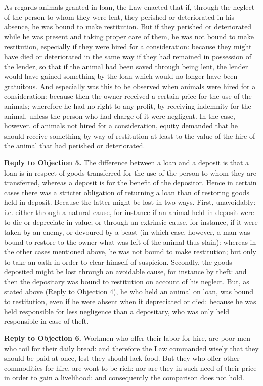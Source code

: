 As regards animals granted in loan, the Law enacted that if, through the neglect of the person to whom they were lent, they perished or deteriorated in his absence, he was bound to make restitution. But if they perished or deteriorated while he was present and taking proper care of them, he was not bound to make restitution, especially if they were hired for a consideration: because they might have died or deteriorated in the same way if they had remained in possession of the lender, so that if the animal had been saved through being lent, the lender would have gained something by the loan which would no longer have been gratuitous. And especially was this to be observed when animals were hired for a consideration: because then the owner received a certain price for the use of the animals; wherefore he had no right to any profit, by receiving indemnity for the animal, unless the person who had charge of it were negligent. In the case, however, of animals not hired for a consideration, equity demanded that he should receive something by way of restitution at least to the value of the hire of the animal that had perished or deteriorated.

\textbf{Reply to Objection 5.} The difference between a loan and a deposit is that a loan is in respect of goods transferred for the use of the person to whom they are transferred, whereas a deposit is for the benefit of the depositor. Hence in certain cases there was a stricter obligation of returning a loan than of restoring goods held in deposit. Because the latter might be lost in two ways. First, unavoidably: i.e. either through a natural cause, for instance if an animal held in deposit were to die or depreciate in value; or through an extrinsic cause, for instance, if it were taken by an enemy, or devoured by a beast (in which case, however, a man was bound to restore to the owner what was left of the animal thus slain): whereas in the other cases mentioned above, he was not bound to make restitution; but only to take an oath in order to clear himself of suspicion. Secondly, the goods deposited might be lost through an avoidable cause, for instance by theft: and then the depositary was bound to restitution on account of his neglect. But, as stated above (Reply to Objection 4), he who held an animal on loan, was bound to restitution, even if he were absent when it depreciated or died: because he was held responsible for less negligence than a depositary, who was only held responsible in case of theft.

\textbf{Reply to Objection 6.} Workmen who offer their labor for hire, are poor men who toil for their daily bread: and therefore the Law commanded wisely that they should be paid at once, lest they should lack food. But they who offer other commodities for hire, are wont to be rich: nor are they in such need of their price in order to gain a livelihood: and consequently the comparison does not hold.

